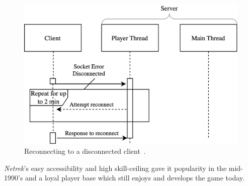 \begin{figure}[h!]
  \includegraphics[width=\columnwidth]{figures/nt-recon}
  \caption{Reconnecting to a disconnected client~\cite{netreksrc}.}
  \Description[]{}
\end{figure}

\textit{Netrek}'s easy accessibility and high skill-ceiling gave it popularity in the mid-1990's and a loyal player base which still enjoys and develops the game today.
